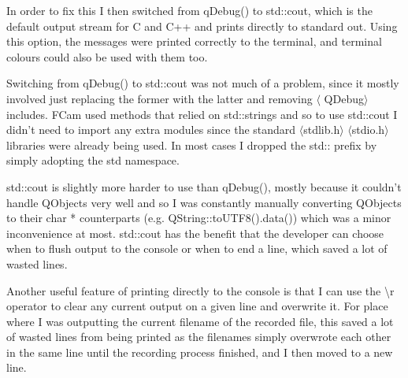 In order to fix this I then switched from qDebug() to std::cout, which is the default output stream for C and C++ and prints directly to standard out. Using this option, the messages were printed correctly to the terminal, and terminal colours could also be used with them too.

Switching from qDebug() to std::cout was not much of a problem, since it mostly involved just replacing the former with the latter and removing \(\langle\) QDebug\(\rangle\) includes. FCam used methods that relied on std::strings and so to use std::cout I didn't need to import any extra modules since the standard \(\langle\)stdlib.h\(\rangle\) \(\langle\)stdio.h\(\rangle\) libraries were already being used. In most cases I dropped the std:: prefix by simply adopting the std namespace.

std::cout is slightly more harder to use than qDebug(), mostly because it couldn't handle QObjects very well and so I was constantly manually converting QObjects to their char * counterparts (e.g. QString::toUTF8().data()) which was a minor inconvenience at most.
std::cout has the benefit that the developer can choose when to flush output to the console or when to end a line, which saved a lot of wasted lines.

Another useful feature of printing directly to the console is that I can use the \textbackslash r operator to clear any current output on a given line and overwrite it. For place where I was outputting the current filename of the recorded file, this saved a lot of wasted lines from being printed as the filenames simply overwrote each other in the same line until the recording process finished, and I then moved to a new line.

